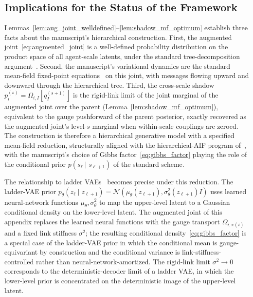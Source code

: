 \documentclass[11pt]{article}
\begin{document}
\subsection{Implications for the Status of the Framework}

Lemmas~\ref{lem:aug_joint_welldefined}--\ref{lem:shadow_mf_optimum} establish three facts about the manuscript's hierarchical construction. First, the augmented joint~\eqref{eq:augmented_joint} is a well-defined probability distribution on the product space of all agent-scale latents, under the standard tree-decomposition argument~\cite[\S3.2]{Lauritzen1996}. Second, the manuscript's variational dynamics are the standard mean-field fixed-point equations~\cite[Prop.~4.1]{Wainwright2008} on this joint, with messages flowing upward and downward through the hierarchical tree. Third, the cross-scale shadow $p_i^{(s)} = \Omega_{i,I}[q_I^{(s+1)}]$ is the rigid-link limit of the joint marginal of the augmented joint over the parent (Lemma~\ref{lem:shadow_mf_optimum}), equivalent to the gauge pushforward of the parent posterior, exactly recovered as the augmented joint's level-$s$ marginal when within-scale couplings are zeroed. The construction is therefore a hierarchical generative model with a specified mean-field reduction, structurally aligned with the hierarchical-AIF program of~\cite{Friston2017, parr2022active}, with the manuscript's choice of Gibbs factor~\eqref{eq:gibbs_factor} playing the role of the conditional prior $p(s_\ell \mid s_{\ell+1})$ of the standard scheme.

The relationship to ladder VAEs~\cite{Sonderby2016} becomes precise under this reduction. The ladder-VAE prior $p_\theta(z_\ell \mid z_{\ell+1}) = \mathcal{N}(\mu_\theta(z_{\ell+1}), \sigma^2_\theta(z_{\ell+1}) I)$ uses learned neural-network functions $\mu_\theta, \sigma^2_\theta$ to map the upper-level latent to a Gaussian conditional density on the lower-level latent. The augmented joint of this appendix replaces the learned neural functions with the gauge transport $\Omega_{i,\pi(i)}$ and a fixed link stiffness $\sigma^2$; the resulting conditional density~\eqref{eq:gibbs_factor} is a special case of the ladder-VAE prior in which the conditional mean is gauge-equivariant by construction and the conditional variance is link-stiffness-controlled rather than neural-network-amortized. The rigid-link limit $\sigma^2 \to 0$ corresponds to the deterministic-decoder limit of a ladder VAE, in which the lower-level prior is concentrated on the deterministic image of the upper-level latent.
\end{document}
